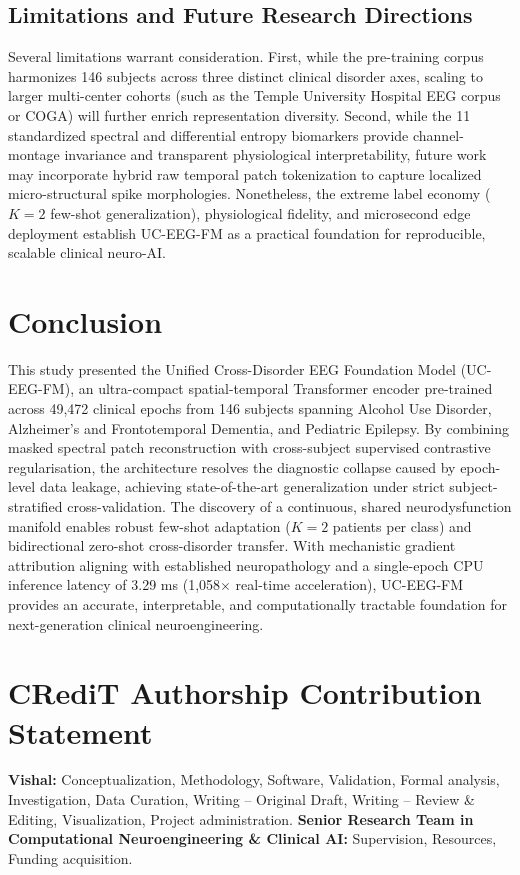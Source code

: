 \documentclass[11pt,a4paper]{article}
\begin{document}
\subsection{Limitations and Future Research Directions}
Several limitations warrant consideration. First, while the pre-training corpus harmonizes 146 subjects across three distinct clinical disorder axes, scaling to larger multi-center cohorts (such as the Temple University Hospital EEG corpus or COGA) will further enrich representation diversity. Second, while the 11 standardized spectral and differential entropy biomarkers provide channel-montage invariance and transparent physiological interpretability, future work may incorporate hybrid raw temporal patch tokenization to capture localized micro-structural spike morphologies. Nonetheless, the extreme label economy ($K=2$ few-shot generalization), physiological fidelity, and microsecond edge deployment establish UC-EEG-FM as a practical foundation for reproducible, scalable clinical neuro-AI.

\section{Conclusion}
\label{sec:conclusion}
This study presented the Unified Cross-Disorder EEG Foundation Model (UC-EEG-FM), an ultra-compact spatial-temporal Transformer encoder pre-trained across 49,472 clinical epochs from 146 subjects spanning Alcohol Use Disorder, Alzheimer's and Frontotemporal Dementia, and Pediatric Epilepsy. By combining masked spectral patch reconstruction with cross-subject supervised contrastive regularisation, the architecture resolves the diagnostic collapse caused by epoch-level data leakage, achieving state-of-the-art generalization under strict subject-stratified cross-validation. The discovery of a continuous, shared neurodysfunction manifold enables robust few-shot adaptation ($K=2$ patients per class) and bidirectional zero-shot cross-disorder transfer. With mechanistic gradient attribution aligning with established neuropathology and a single-epoch CPU inference latency of 3.29 ms (1,058$\times$ real-time acceleration), UC-EEG-FM provides an accurate, interpretable, and computationally tractable foundation for next-generation clinical neuroengineering.

\section*{CRediT Authorship Contribution Statement}
\textbf{Vishal:} Conceptualization, Methodology, Software, Validation, Formal analysis, Investigation, Data Curation, Writing -- Original Draft, Writing -- Review \& Editing, Visualization, Project administration. \textbf{Senior Research Team in Computational Neuroengineering \& Clinical AI:} Supervision, Resources, Funding acquisition.
\end{document}
